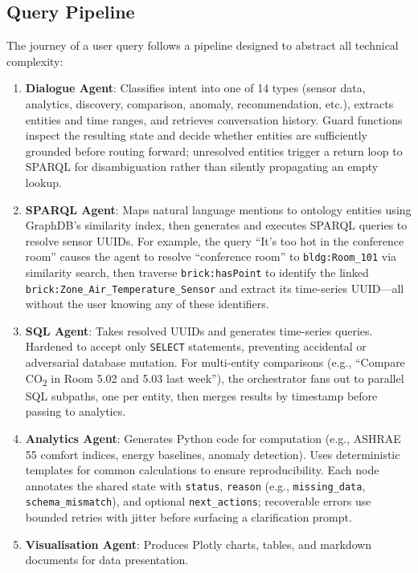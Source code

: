 \documentclass[acmsmall]{acmart}
\begin{document}
\subsection{Query Pipeline}

The journey of a user query follows a pipeline designed to abstract all technical complexity:

\begin{enumerate}
    \item \textbf{Dialogue Agent}: Classifies intent into one of 14 types (sensor data, analytics, discovery, comparison, anomaly, recommendation, etc.), extracts entities and time ranges, and retrieves conversation history. Guard functions inspect the resulting state and decide whether entities are sufficiently grounded before routing forward; unresolved entities trigger a return loop to SPARQL for disambiguation rather than silently propagating an empty lookup.
    \item \textbf{SPARQL Agent}: Maps natural language mentions to ontology entities using GraphDB's similarity index, then generates and executes SPARQL queries to resolve sensor UUIDs. For example, the query ``It's too hot in the conference room'' causes the agent to resolve ``conference room'' to \texttt{bldg:Room\_101} via similarity search, then traverse \texttt{brick:hasPoint} to identify the linked \texttt{brick:Zone\_Air\_Temperature\_Sensor} and extract its time-series UUID---all without the user knowing any of these identifiers.
    \item \textbf{SQL Agent}: Takes resolved UUIDs and generates time-series queries. Hardened to accept only \texttt{SELECT} statements, preventing accidental or adversarial database mutation. For multi-entity comparisons (e.g., ``Compare CO\textsubscript{2} in Room 5.02 and 5.03 last week''), the orchestrator fans out to parallel SQL subpaths, one per entity, then merges results by timestamp before passing to analytics.
    \item \textbf{Analytics Agent}: Generates Python code for computation (e.g., ASHRAE 55 comfort indices, energy baselines, anomaly detection). Uses deterministic templates for common calculations to ensure reproducibility. Each node annotates the shared state with \texttt{status}, \texttt{reason} (e.g., \texttt{missing\_data}, \texttt{schema\_mismatch}), and optional \texttt{next\_actions}; recoverable errors use bounded retries with jitter before surfacing a clarification prompt.
    \item \textbf{Visualisation Agent}: Produces Plotly charts, tables, and markdown documents for data presentation.
\end{enumerate}
\end{document}
